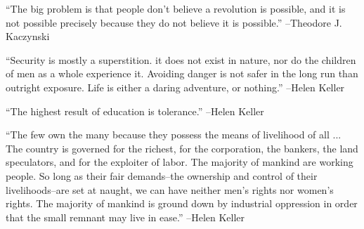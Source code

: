 \documentclass{article}%
\begin{document}
\linebreak%
\vspace{1mm}%
\begin{minipage}{\textwidth}%
\flushleft%
“The big problem is that people don't believe a revolution is possible, and it is not possible precisely because they do not believe it is possible.”%
\linebreak%
\vspace{1mm}%
–Theodore J. Kaczynski%
\linebreak%
\vspace{1mm}%
\end{minipage}%
\linebreak%
\vspace{1mm}%
\begin{minipage}{\textwidth}%
\flushleft%
“Security is mostly a superstition. it does not exist in nature, nor do the children of men as a whole experience it. Avoiding danger is not safer in the long run than outright exposure. Life is either a daring adventure, or nothing.”%
\linebreak%
\vspace{1mm}%
–Helen Keller%
\linebreak%
\vspace{1mm}%
\end{minipage}%
\linebreak%
\vspace{1mm}%
\begin{minipage}{\textwidth}%
\flushleft%
“The highest result of education is tolerance.”%
\linebreak%
\vspace{1mm}%
–Helen Keller%
\linebreak%
\vspace{1mm}%
\end{minipage}%
\linebreak%
\vspace{1mm}%
\begin{minipage}{\textwidth}%
\flushleft%
“The few own the many because they possess the means of livelihood of all ... The country is governed for the richest, for the corporation, the bankers, the land speculators, and for the exploiter of labor. The majority of mankind are working people. So long as their fair demands–the ownership and control of their livelihoods–are set at naught, we can have neither men's rights nor women's rights. The majority of mankind is ground down by industrial oppression in order that the small remnant may live in ease.”%
\linebreak%
\vspace{1mm}%
–Helen Keller%
\linebreak%
\vspace{1mm}%
\end{minipage}%
\end{document}
